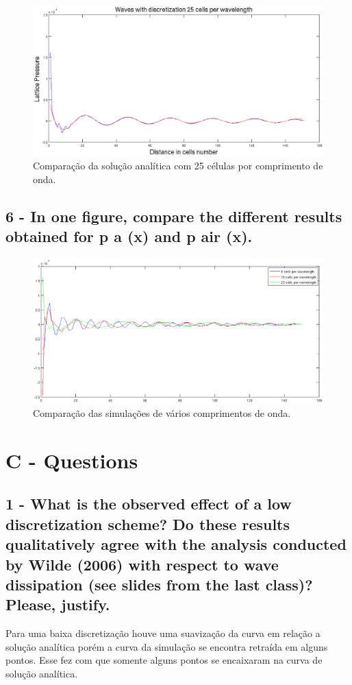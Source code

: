 \begin{figure}[h!]
    \centering
    \hspace{-2.5cm}
    \includegraphics[width=1.2\textwidth]{figuras/compare_25_cells_discretization.eps}
    \caption{Comparação da solução analítica com 25 células por comprimento de onda.}
\end{figure}

\subsection{6 - In one figure, compare the different results obtained for p a (x) and p air (x).}
\begin{figure}[h!]
    \centering
    \hspace{-2.5cm}
    \includegraphics[width=1.2\textwidth]{figuras/all_in_one.eps}
    \caption{Comparação das simulações de vários comprimentos de onda.}
\end{figure}

\section{C - Questions} %

\subsection{1 - What is the observed effect of a low discretization scheme? Do these results qualitatively agree with
the analysis conducted by Wilde (2006) with respect to wave dissipation (see slides from the last class)?
Please, justify.} 
Para uma baixa discretização houve uma suavização da curva em relação a solução analítica porém a curva da simulação se encontra retraída em alguns pontos. Esse fez com que somente alguns pontos se encaixaram na curva de solução analítica.

